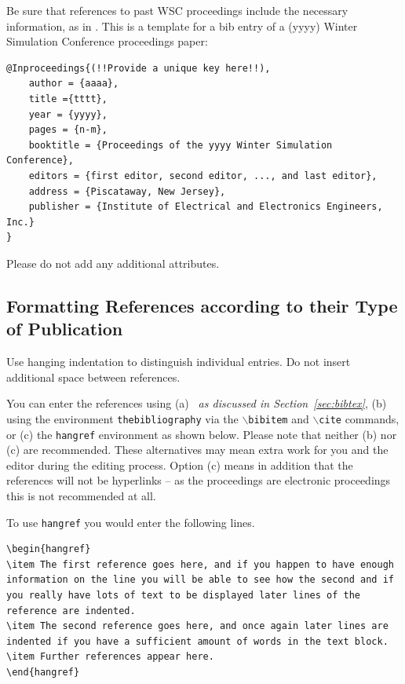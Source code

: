 \documentclass{wscpaperproc}
\theoremstyle{wsc}
\begin{document}
Be sure that references to past WSC proceedings include the necessary information, as in . 
This is a template for a bib entry of a (yyyy) Winter Simulation Conference proceedings paper:\newline

\begin{verbatim}
@Inproceedings{(!!Provide a unique key here!!),
	author = {aaaa},
	title ={tttt},
	year = {yyyy},
	pages = {n-m},
	booktitle = {Proceedings of the yyyy Winter Simulation Conference},
	editors = {first editor, second editor, ..., and last editor},
	address = {Piscataway, New Jersey},
	publisher = {Institute of Electrical and Electronics Engineers, Inc.}
}
\end{verbatim}\vspace{5mm}

Please do not add any additional attributes.


\subsection{Formatting References according to their Type of Publication}

Use hanging indentation to distinguish individual entries. Do not insert additional space between references.

You can enter the references using (a) {\em \BibTeX\ as discussed in Section~\ref{sec:bibtex}}, (b) using the environment {\tt thebibliography} via the {\tt $\backslash$bibitem} and {\tt $\backslash$cite} commands, or (c) the {\tt hangref} environment as shown below.
Please note that neither (b) nor (c) are recommended. These alternatives may mean extra work for you and the editor during the editing process. Option (c) means in addition that the references will not be hyperlinks -- as the proceedings are electronic proceedings this is not recommended at all.

To use {\tt hangref} you would enter the following lines.\newline

\begin{verbatim}
\begin{hangref}
\item The first reference goes here, and if you happen to have enough 
information on the line you will be able to see how the second and if
you really have lots of text to be displayed later lines of the
reference are indented.
\item The second reference goes here, and once again later lines are
indented if you have a sufficient amount of words in the text block.
\item Further references appear here.
\end{hangref}
\end{verbatim}\vspace{4mm}
\end{document}
